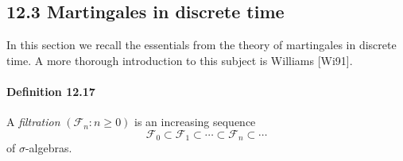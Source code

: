 \documentclass{article}
\begin{document}
\subsection*{12.3 Martingales in discrete time}

In this section we recall the essentials from the theory of martingales in discrete time. A more thorough introduction to this subject is Williams [Wi91].

\paragraph{Definition 12.17} A \textit{filtration} $(\mathcal{F}_n : n \geq 0)$ is an increasing sequence
\[
\mathcal{F}_0 \subset \mathcal{F}_1 \subset \cdots \subset \mathcal{F}_n \subset \cdots
\]
of $\sigma$-algebras.
\end{document}

